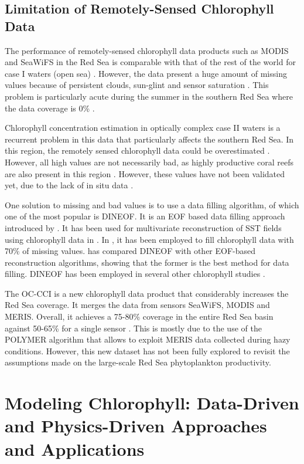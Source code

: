 \subsection{Limitation of Remotely-Sensed Chlorophyll Data}

The performance of remotely-sensed chlorophyll data products such as MODIS and SeaWiFS in the Red Sea is comparable with that of the rest of the world for case I waters (open sea) \cite{Brewin2013}. However, the data present a huge amount of missing values because of persistent clouds, sun-glint and sensor saturation \cite{Racault}. This problem is particularly acute during the summer in the southern Red Sea where the data coverage is 0\% \cite{Racault}.

Chlorophyll concentration estimation in optically complex case II waters is a recurrent problem in this data that particularly affects the southern Red Sea. In this region, the remotely sensed chlorophyll data could be overestimated \cite{Raitsos2013}. However, all high values are not necessarily bad, as highly productive coral reefs are also present in this region \cite{Raitsos2013}. However, these values have not been validated yet, due to the lack of in situ data \cite{Raitsos2013}.

One solution to missing and bad values is to use a data filling algorithm, of which one of the most popular is DINEOF. It is an EOF based data filling approach introduced by \cite{Beckers2003}. It has been used for multivariate reconstruction of SST fields using chlorophyll data in \cite{Alvera2007}. In \cite{Sicarjobs2011}, it has been employed to fill chlorophyll data with 70\% of missing values. \cite{Taylor2013} has compared DINEOF with other EOF-based reconstruction algorithms, showing that the former is the best method for data filling. DINEOF has been employed in several other chlorophyll studies \cite{Miles2010, Waite2013}.

The OC-CCI is a new chlorophyll data product that considerably increases the Red Sea coverage. It merges the data from sensors SeaWiFS, MODIS and MERIS. Overall, it achieves a 75-80\% coverage in the entire Red Sea basin against 50-65\% for a single sensor \cite{Racault}. This is mostly due to the use of the POLYMER algorithm \cite{Steinmetz2011} that allows to exploit MERIS data collected during hazy conditions. However, this new dataset has not been fully explored to revisit the assumptions made on the large-scale Red Sea phytoplankton productivity.

\section{Modeling Chlorophyll: Data-Driven and Physics-Driven Approaches and 
Applications}

